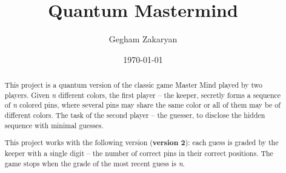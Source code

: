 \documentclass[10pt,onecolumn]{article}
\title{Quantum Mastermind}
\author[1]{Gegham Zakaryan}
\affil{American University of Armenia}
\affil{College of Science and Engineering}
\affil{CS339 - Quantum Computing}
\date{\today}
\begin{document}
\maketitle

\begin{abstract}
This project is a quantum version of the classic game Master Mind played by two players. Given \textit{n} different colors, the first player – the keeper, secretly forms a sequence of \textit{n} colored pins, where several pins may share the same color or all of them may be of different colors. The task of the second player – the guesser, to disclose the hidden sequence with minimal guesses.

This project works with the following version (\textbf{version 2}): each guess is graded by the keeper with a single digit – the number of correct
pins in their correct positions. The game stops when the grade of the most recent guess is \textit{n}.
\end{abstract}

\tableofcontents







\nocite*{} %


\appendix


\end{document}
